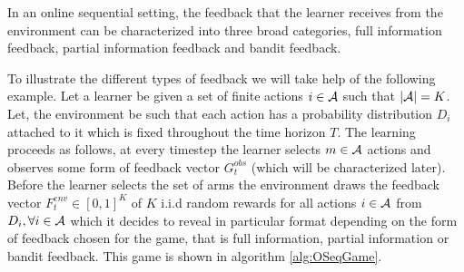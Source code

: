 In an online sequential setting, the feedback that the learner receives from the environment can be characterized into three broad categories, full information feedback, partial information feedback and bandit feedback. 


    To illustrate the different types of feedback we will take help of the following example. Let a learner be given a set of finite actions $i\in\mathcal{A}$ such that $|\mathcal{A}|=K$. Let, the environment be such that each action has a probability distribution $D_i$ attached to it which is fixed throughout the time horizon $T$. The learning proceeds as follows, at every timestep the learner selects $m\in\mathcal{A}$ actions and observes some form of feedback vector $G^{obs}_{t}$ (which will be characterized later). Before the learner selects the set of arms the environment draws the feedback vector $F^{env}_t\in[0,1]^{K}$ of $K$ i.i.d random rewards for all actions $i\in\mathcal{A}$ from $D_i,\forall i\in\mathcal{A}$ which it decides to reveal in particular format depending on the form of feedback chosen for the game, that is full information, partial information or bandit feedback. This game is shown in algorithm \ref{alg:OSeqGame}. 




